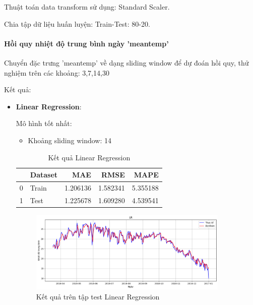     Thuật toán data transform sử dụng: Standard Scaler.

    Chia tập dữ liệu huấn luyện: Train-Test: 80-20.

    \paragraph{Hồi quy nhiệt độ trung bình ngày 'meantemp'}
    \leavevmode

    Chuyển đặc trưng 'meantemp' về dạng sliding window để dự đoán hồi quy, thử nghiệm trên các khoảng: 3,7,14,30

    Kết quả:
    \begin{itemize}
        \item \textbf{Linear Regression}: 
        
            Mô hình tốt nhất:
            \begin{itemize}
                \item Khoảng sliding window: 14
            \end{itemize}

            \begin{table}[htbp]
            \centering
            \caption{Kết quả Linear Regression}
            \label{tab:weather-meantemp-lireg}
            \begin{tabular}{llrrr}
            \hline
             & Dataset & MAE & RMSE & MAPE \\
            \hline
            0 & Train & 1.206136 & 1.582341 & 5.355188 \\
            1 & Test & 1.225678 & 1.609280 & 4.539541 \\
            \hline
            \end{tabular}
            \end{table}
  
            
            \FloatBarrier

            \begin{figure}[htp]
                \centering
                \includegraphics[width=0.90\textwidth]{images/TS_weather_pred_cmp_LR.png}
                \caption{Kết quả trên tập test Linear Regression}
                \label{fig:TS_weather_pred_cmp_LR}
            \end{figure}
        

\end{itemize}
